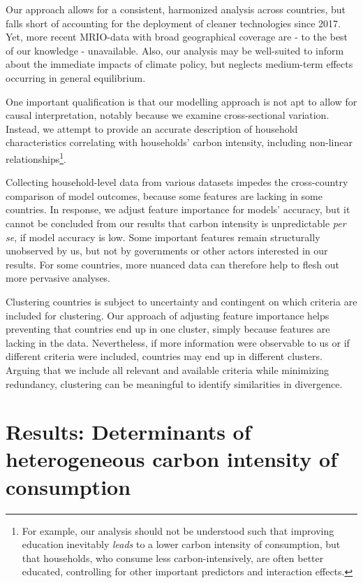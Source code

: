 \documentclass[12pt, a4paper]{article}
\begin{document}
Our approach allows for a consistent, harmonized analysis across countries, but falls short of accounting for the deployment of cleaner technologies since 2017. Yet, more recent MRIO-data with broad geographical coverage are - to the best of our knowledge - unavailable. Also, our analysis may be well-suited to inform about the immediate impacts of climate policy, but neglects medium-term effects occurring in general equilibrium. 

One important qualification is that our modelling approach is not apt to allow for causal interpretation, notably because we examine cross-sectional variation. Instead, we attempt to provide an accurate description of household characteristics correlating with households' carbon intensity, including non-linear relationships\footnote{For example, our analysis should not be understood such that improving education inevitably \textit{leads} to a lower carbon intensity of consumption, but that households, who consume less carbon-intensively, are often better educated, controlling for other important predictors and interaction effects.}.

Collecting household-level data from various datasets impedes the cross-country comparison of model outcomes, because some features are lacking in some countries. In response, we adjust feature importance for models' accuracy, but it cannot be concluded from our results that carbon intensity is unpredictable \textit{per se}, if model accuracy is low. Some important features remain structurally unobserved by us, but not by governments or other actors interested in our results. For some countries, more nuanced data can therefore help to flesh out more pervasive analyses.

Clustering countries is subject to uncertainty and contingent on which criteria are included for clustering. Our approach of adjusting feature importance helps preventing that countries end up in one cluster, simply because features are lacking in the data. Nevertheless, if more information were observable to us or if different criteria were included, countries may end up in different clusters. Arguing that we include all relevant and available criteria while minimizing redundancy, clustering can be meaningful to identify similarities in divergence.

\section{Results: Determinants of heterogeneous carbon intensity of consumption} \label{sec:results}
\end{document}
